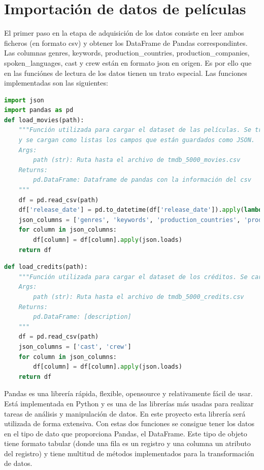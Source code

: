 \newpage
\section{Importación de datos de películas}

El primer paso en la etapa de adquisición de los datos consiste en leer ambos ficheros (en formato csv) y obtener los DataFrame de Pandas correspondintes. Las columnas genres, keywords, production\_countries, production\_companies, spoken\_languages, cast y crew están en formato json en origen. Es por ello que en las funciónes de lectura de los datos tienen un trato especial. Las funciones implementadas son las siguientes:

\begin{lstlisting}[language=Python, caption=Lectura de los datos del fichero de películas.]
import json
import pandas as pd
def load_movies(path):
    """Función utilizada para cargar el dataset de las películas. Se transforma a fecha el campo de fecha de salida
    y se cargan como listas los campos que están guardados como JSON.
    Args:
        path (str): Ruta hasta el archivo de tmdb_5000_movies.csv
    Returns:
        pd.DataFrame: Dataframe de pandas con la información del csv
    """
    df = pd.read_csv(path)
    df['release_date'] = pd.to_datetime(df['release_date']).apply(lambda x: x.date())
    json_columns = ['genres', 'keywords', 'production_countries', 'production_companies', 'spoken_languages']
    for column in json_columns:
        df[column] = df[column].apply(json.loads)
    return df
\end{lstlisting}

\begin{lstlisting}[language=Python, caption=Lectura de los datos del fichero de créditos.]
def load_credits(path):
    """Función utilizada para cargar el dataset de los créditos. Se cargan como listas los campos que están guardado
    Args:
        path (str): Ruta hasta el archivo de tmdb_5000_credits.csv
    Returns:
        pd.DataFrame: [description]
    """
    df = pd.read_csv(path)
    json_columns = ['cast', 'crew']
    for column in json_columns:
        df[column] = df[column].apply(json.loads)
    return df
\end{lstlisting}

Pandas es una librería rápida, flexible, opensource y relativamente fácil de usar. Está implementada en Python y es una de las librerías más usadas para realizar tareas de análisis y manipulación de datos. En este proyecto esta librería será utilizada de forma extensiva. Con estas dos funciones se consigue tener los datos en el tipo de dato que proporciona Pandas, el DataFrame. Este tipo de objeto tiene formato tabular (donde una fila es un registro y una columna un atributo del registro) y tiene multitud de métodos implementados para la transformación de datos.\\


